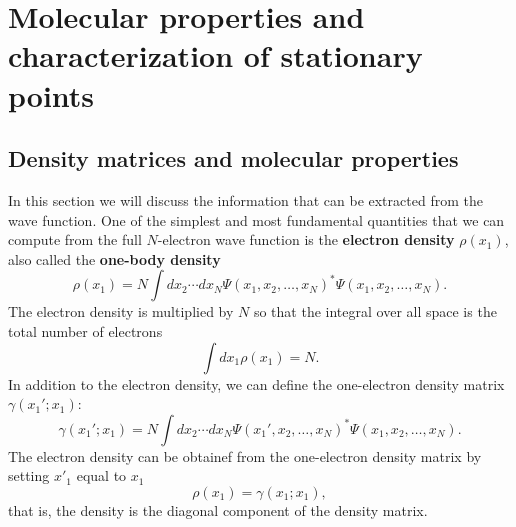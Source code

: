 \documentclass[../Main/chem532-notes.tex]{subfiles}
\begin{document}
\chapter{Molecular properties and characterization of stationary points}

\section{Density matrices and molecular properties}
In this section we will discuss the information that can be extracted from the wave function.
One of the simplest and most fundamental quantities that we can compute from the full $N$-electron wave function is the \textbf{electron density} $\rho(x_1)$, also called the \textbf{one-body density}
\begin{equation}
\rho(x_1) = N \int dx_2 \cdots dx_N \Psi(x_1,x_2,\ldots,x_N)^* \Psi(x_1,x_2,\ldots,x_N).
\end{equation}
The electron density is multiplied by $N$ so that the integral over all space is the total number of electrons
\begin{equation}
\int dx_1 \rho(x_1) = N.
\end{equation}
In addition to the electron density, we can define the one-electron density matrix $\gamma(x_1';x_1)$:
\begin{equation}
\gamma(x_1';x_1) = N \int dx_2 \cdots dx_N \Psi(x_1',x_2,\ldots,x_N)^* \Psi(x_1,x_2,\ldots,x_N).
\end{equation}
The electron density can be obtainef from the one-electron density matrix by setting $x'_1$ equal to $x_1$
\begin{equation}
\rho(x_1) = \gamma(x_1;x_1),
\end{equation}
that is, the density is the diagonal component of the density matrix.
\end{document}

